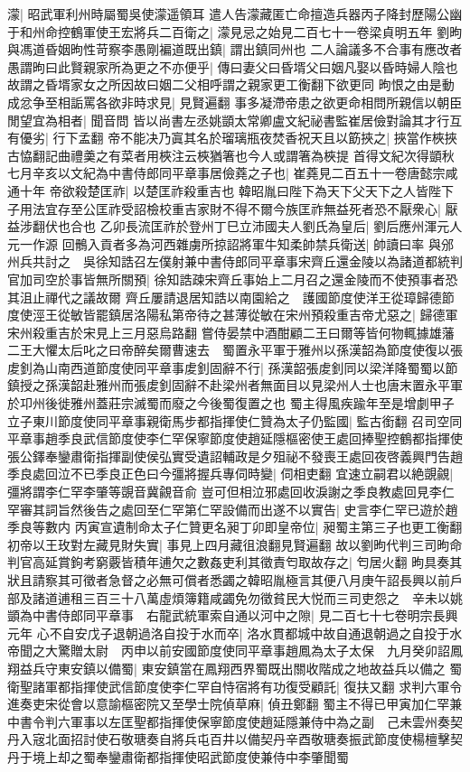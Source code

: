 濛|{
	昭武軍利州時屬蜀吳使濛遥領耳}
遣人告濛藏匿亡命擅造兵器丙子降封歷陽公幽于和州命控鶴軍使王宏將兵二百衛之|{
	濛見忌之始見二百七十一卷梁貞明五年}
劉昫與馮道昏姻昫性苛察李愚剛褊道既出鎮|{
	謂出鎮同州也}
二人論議多不合事有應改者愚謂昫曰此賢親家所為更之不亦便乎|{
	傳曰妻父曰昏壻父曰姻凡娶以昏時婦人陰也故謂之昏壻家女之所因故曰姻二父相呼謂之親家更工衡翻下欲更同}
昫恨之由是動成忿争至相詬罵各欲非時求見|{
	見賢遍翻}
事多凝滯帝患之欲更命相問所親信以朝臣閒望宜為相者|{
	聞音問}
皆以尚書左丞姚顗太常卿盧文紀祕書監崔居儉對論其才行互有優劣|{
	行下孟翻}
帝不能决乃寘其名於瑠璃瓶夜焚香祝天且以筯挾之|{
	挾當作梜挾古恊翻記曲禮羮之有菜者用梜注云梜猶箸也今人或謂箸為梜提}
首得文紀次得顗秋七月辛亥以文紀為中書侍郎同平章事居儉蕘之子也|{
	崔蕘見二百五十一卷唐懿宗咸通十年}
帝欲殺楚匡祚|{
	以楚匡祚殺重吉也}
韓昭胤曰陛下為天下父天下之人皆陛下子用法宜存至公匡祚受詔檢校重吉家財不得不爾今族匡祚無益死者恐不厭衆心|{
	厭益涉翻伏也合也}
乙卯長流匡祚於登州丁巳立沛國夫人劉氏為皇后|{
	劉后應州渾元人元一作源}
回鶻入貢者多為河西雜虜所掠詔將軍牛知柔帥禁兵衛送|{
	帥讀曰率}
與邠州兵共討之　吳徐知誥召左僕射兼中書侍郎同平章事宋齊丘還金陵以為諸道都統判官加司空於事皆無所關預|{
	徐知誥疎宋齊丘事始上二月召之還金陵而不使預事者恐其沮止禪代之議故爾}
齊丘屢請退居知誥以南園給之　護國節度使洋王從璋歸德節度使涇王從敏皆罷鎮居洛陽私第帝待之甚薄從敏在宋州預殺重吉帝尤惡之|{
	歸德軍宋州殺重吉於宋見上三月惡烏路翻}
嘗侍晏禁中酒酣顧二王曰爾等皆何物輒據雄藩二王大懼太后叱之曰帝醉矣爾曹速去　蜀置永平軍于雅州以孫漢韶為節度使復以張䖍釗為山南西道節度使同平章事䖍釗固辭不行|{
	孫漢韶張䖍釗同以梁洋降蜀蜀以節鎮授之孫漢韶赴雅州而張䖍釗固辭不赴梁州者無面目以見梁州人士也唐末置永平軍於卭州後徙雅州蓋莊宗滅蜀而廢之今後蜀復置之也}
蜀主得風疾踰年至是增劇甲子立子東川節度使同平章事親衛馬步都指揮使仁贊為太子仍監國|{
	監古銜翻}
召司空同平章事趙季良武信節度使李仁罕保寧節度使趙延隱樞密使王處回捧聖控鶴都指揮使張公鐸奉鑾肅衛指揮副使侯弘實受遺詔輔政是夕殂祕不發喪王處回夜啓義興門告趙季良處回泣不已季良正色曰今彊將握兵專伺時變|{
	伺相吏翻}
宜速立嗣君以絶覬覦|{
	彊將謂李仁罕李肇等覬音冀覦音俞}
豈可但相泣邪處回收淚謝之季良教處回見李仁罕審其詞旨然後告之處回至仁罕第仁罕設備而出遂不以實告|{
	史言李仁罕已遊於趙季良等數内}
丙寅宣遺制命太子仁贊更名昶丁卯即皇帝位|{
	昶蜀主第三子也更工衡翻}
初帝以王玫對左藏見財失實|{
	事見上四月藏徂浪翻見賢遍翻}
故以劉昫代判三司昫命判官高延賞鉤考窮覈皆積年逋欠之數姦吏利其徵責匄取故存之|{
	匄居火翻}
昫具奏其狀且請察其可徵者急督之必無可償者悉蠲之韓昭胤極言其便八月庚午詔長興以前戶部及諸道逋租三百三十八萬虛煩簿籍咸蠲免勿徵貧民大悦而三司吏怨之　辛未以姚顗為中書侍郎同平章事　右龍武統軍索自通以河中之隙|{
	見二百七十七卷明宗長興元年}
心不自安戊子退朝過洛自投于水而卒|{
	洛水貫都城中故自通退朝過之自投于水}
帝聞之大驚贈太尉　丙申以前安國節度使同平章事趙鳳為太子太保　九月癸卯詔鳳翔益兵守東安鎮以備蜀|{
	東安鎮當在鳳翔西界蜀既出關收階成之地故益兵以備之}
蜀衛聖諸軍都指揮使武信節度使李仁罕自恃宿將有功復受顧託|{
	復扶又翻}
求判六軍令進奏吏宋從會以意諭樞密院又至學士院偵草麻|{
	偵丑鄭翻}
蜀主不得已甲寅加仁罕兼中書令判六軍事以左匡聖都指揮使保寧節度使趙延隱兼侍中為之副　己未雲州奏契丹入宼北面招討使石敬瑭奏自將兵屯百井以備契丹辛酉敬瑭奏振武節度使楊檀擊契丹于境上却之蜀奉鑾肅衛都指揮使昭武節度使兼侍中李肇聞蜀

